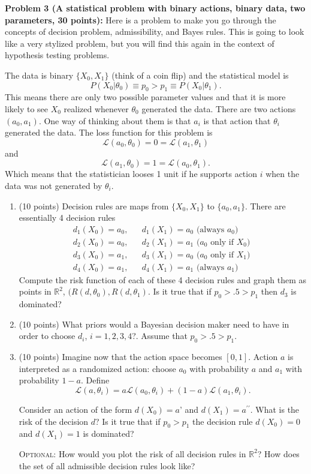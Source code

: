 \documentclass[11pt]{article} %
\begin{document}
\noindent \textbf{Problem 3 (A statistical problem with binary actions, binary data, two parameters, 30 points):} Here is a problem to make you go through the concepts of decision problem, admissibility, and Bayes rules. This is going to look like a very stylized problem, but you will find this again in the context of hypothesis testing problems. 

The data is binary $\{X_0, X_1\}$ (think of a coin flip) and the statistical model is
\[ P(X_0 | \theta_0) \equiv p_0 > p_1 \equiv P(X_0 | \theta_1 ). \]
This means there are only two possible parameter values and that it is more likely to see $X_0$ realized whenever $\theta_0$ generated the data. 
There are two actions $(a_0, a_1)$. One way of thinking about them is that $a_i$ is that action that $\theta_i$ generated the data. The loss function for this problem is 
\[ \mathcal{L}(a_0, \theta_0) = 0 = \mathcal{L}(a_1, \theta_1)    \]
and
\[ \mathcal{L}(a_1, \theta_0) = 1 = \mathcal{L}(a_0, \theta_1).    \]
Which means that the statistician looses 1 unit if he supports action $i$ when the data was not generated by $\theta_i$. 
\begin{enumerate}
\item (10 points) Decision rules are maps from $\{ X_0 , X_1 \}$ to $\{a_0, a_1\}$. There are essentially 4 decision rules 
\begin{eqnarray*}
d_1(X_0) =a_0, && d_1(X_1) = a_0 \textrm{ (always $a_0$)}\\
d_2(X_0) = a_0, && d_2(X_1) = a_1 \textrm{ ($a_0$ only if $X_0$)  }\\
d_3(X_0) = a_1, && d_3(X_1) = a_0 \textrm{ ($a_0$ only if $X_1$)  }\\
d_4(X_0) = a_1, && d_4(X_1) = a_1 \textrm{ (always $a_1$)  }
\end{eqnarray*}
Compute the risk function of each of these 4 decision rules and graph them as points in $\mathbb{R}^2$, $(R(d,\theta_0), R(d,\theta_1)$. Is it true that if $p_0 > .5 > p_1$ then $d_3$ is dominated?

\item (10 points) What priors would a Bayesian decision maker need to have in order to choose $d_i$, $i=1,2,3, 4$?. Assume that $p_0 > .5 > p_1$. \\

\item (10 points) Imagine now that the action space becomes $[0,1]$. Action $a$ is interpreted as a randomized action: choose $a_0$ with probability $a$ and $a_1$ with probability $1-a$. Define
$$ \mathcal{L}(a,\theta_i) = a \mathcal{L}(a_0, \theta_i) + (1-a) \mathcal{L}(a_1,\theta_i).$$

Consider an action of the form $d(X_0) = a’$ and $d(X_1)= a^{\prime \prime}$. What is the risk of the decision $d$? Is it true that if $p_0 > p_1$ the decision rule $d(X_0) = 0$ and $d(X_1) = 1$ is dominated? 

{\scshape Optional:} How would you plot the risk of all decision rules in $\mathbb{R}^2$? How does the set of all admissible decision rules look like?

\end{enumerate}
\end{document}
